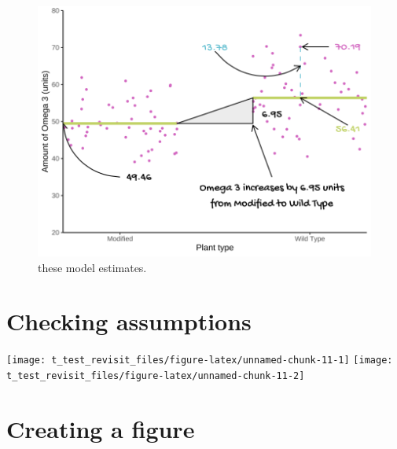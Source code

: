\documentclass[
]{book}
\newenvironment{Shaded}{\begin{snugshade}}{\end{snugshade}}
\newcommand{\CommentTok}[1]{\textcolor[rgb]{0.56,0.35,0.01}{\textit{#1}}}
\newcommand{\DataTypeTok}[1]{\textcolor[rgb]{0.13,0.29,0.53}{#1}}
\newcommand{\DecValTok}[1]{\textcolor[rgb]{0.00,0.00,0.81}{#1}}
\newcommand{\KeywordTok}[1]{\textcolor[rgb]{0.13,0.29,0.53}{\textbf{#1}}}
\newcommand{\NormalTok}[1]{#1}
\newcommand{\OperatorTok}[1]{\textcolor[rgb]{0.81,0.36,0.00}{\textbf{#1}}}
\begin{document}
\begin{figure}

\includegraphics[width=0.8\linewidth]{images/fig_6} \hfill{}

\caption{these model estimates.}\label{fig:csat-annotated}
\end{figure}

\hypertarget{checking-assumptions-1}{%
\section{Checking assumptions}\label{checking-assumptions-1}}

\begin{Shaded}
\end{Shaded}

\begin{flushleft}\texttt{[image: t\_test\_revisit\_files/figure-latex/unnamed-chunk-11-1]} \texttt{[image: t\_test\_revisit\_files/figure-latex/unnamed-chunk-11-2]} \end{flushleft}

\hypertarget{creating-a-figure-1}{%
\section{Creating a figure}\label{creating-a-figure-1}}
\end{document}
